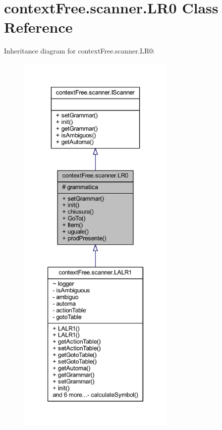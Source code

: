 \hypertarget{classcontext_free_1_1scanner_1_1_l_r0}{\section{context\-Free.\-scanner.\-L\-R0 Class Reference}
\label{classcontext_free_1_1scanner_1_1_l_r0}
}


Inheritance diagram for context\-Free.\-scanner.\-L\-R0\-:\nopagebreak
\begin{figure}[H]
\begin{center}
\leavevmode
\includegraphics[height=550pt]{classcontext_free_1_1scanner_1_1_l_r0__inherit__graph}
\end{center}
\end{figure}


